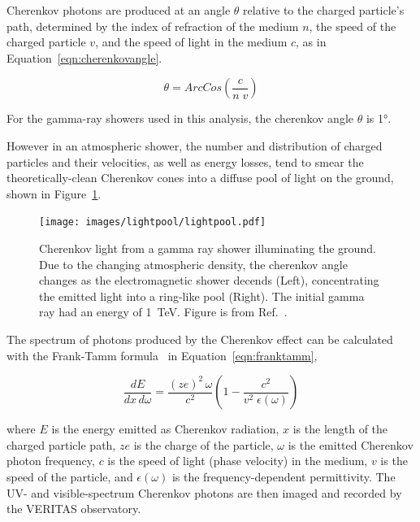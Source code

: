   Cherenkov photons are produced at an angle $\theta$ relative to the charged particle's path, determined by the index of refraction of the medium $n$, the speed of the charged particle $v$, and the speed of light in the medium $c$, as in Equation~\ref{eqn:cherenkovangle}.

  \begin{equation}\label{eqn:cherenkovangle}
    \theta = ArcCos \left ( \frac{c}{n \; v} \right )
  \end{equation}
  
  For the gamma-ray showers used in this analysis, the cherenkov angle $\theta$ is \nicetilde\ang{1}.

  However in an atmospheric shower, the number and distribution of charged particles and their velocities, as well as energy losses, tend to smear the theoretically-clean Cherenkov cones into a diffuse pool of light on the ground, shown in Figure~\ref{fig:lightpool}.

  \begin{figure}[ht]
    \centering
    \texttt{[image: images/lightpool/lightpool.pdf]}
    \caption[Chernekov Light Pool]{
      Cherenkov light from a gamma ray shower illuminating the ground.
      Due to the changing atmospheric density, the cherenkov angle changes as the electromagnetic shower decends (Left), concentrating the emitted light into a ring-like pool (Right).
      The initial gamma ray had an energy of \SI{1}{\TeV}.
      Figure is from Ref.~\cite{Voelk}.
    }
    \label{fig:lightpool}
  \end{figure}
  
  The spectrum of photons produced by the Cherenkov effect can be calculated with the Frank-Tamm formula~\cite{franktamm1,franktamm2} in Equation~\ref{eqn:franktamm},
  
  \begin{equation}\label{eqn:franktamm}
    \frac{dE}{dx\,d\omega}=\frac{(ze)^2 \, \omega}{c^2} \left ( 1 - \frac{c^2}{v^2 \;\epsilon(\omega)} \right )
  \end{equation}
  
  where $E$ is the energy emitted as Cherenkov radiation, $x$ is the length of the charged particle path, $ze$ is the charge of the particle, $\omega$ is the emitted Cherenkov photon frequency, $c$ is the speed of light (phase velocity) in the medium, $v$ is the speed of the particle, and $\epsilon(\omega)$ is the frequency-dependent permittivity.
  The UV- and visible-spectrum Cherenkov photons are then imaged and recorded by the VERITAS observatory.
  
